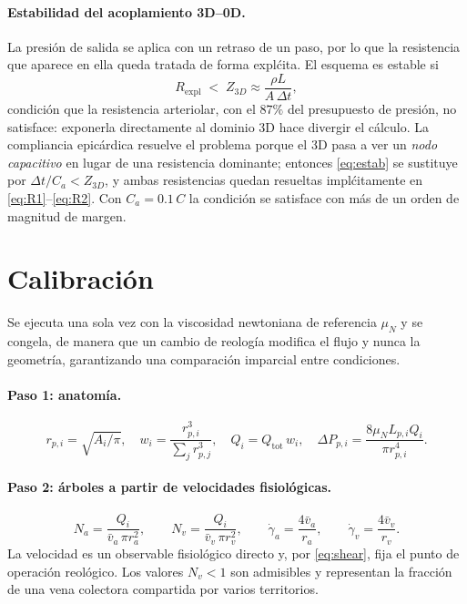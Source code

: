 \documentclass[11pt]{article}
\begin{document}
\paragraph{Estabilidad del acoplamiento 3D--0D.} La presi\'on de salida se
aplica con un retraso de un paso, por lo que la resistencia que aparece en ella
queda tratada de forma expl\'cita. El esquema es estable si
\begin{equation}
  R_{\text{expl}}\;<\;Z_{3D}\approx\frac{\rho L}{A\,\Delta t},
  \label{eq:estab}
\end{equation}
condici\'on que la resistencia arteriolar, con el $87\%$ del presupuesto de
presi\'on, no satisface: exponerla directamente al dominio 3D hace divergir el
c\'alculo. La compliancia epic\'ardica resuelve el problema porque el 3D pasa a
ver un \emph{nodo capacitivo} en lugar de una resistencia dominante; entonces
\eqref{eq:estab} se sustituye por $\Delta t/C_a<Z_{3D}$, y ambas resistencias
quedan resueltas impl\'citamente en \eqref{eq:R1}--\eqref{eq:R2}. Con
$C_a=0.1\,C$ la condici\'on se satisface con m\'as de un orden de magnitud de
margen.

\section{Calibraci\'on}

Se ejecuta una sola vez con la viscosidad newtoniana de referencia $\mu_N$ y se
congela, de manera que un cambio de reolog\'ia modifica el flujo y nunca la
geometr\'ia, garantizando una comparaci\'on imparcial entre condiciones.

\paragraph{Paso 1: anatom\'ia.}
\begin{equation}
  r_{p,i}=\sqrt{A_i/\pi},
  \quad
  w_i=\frac{r_{p,i}^{3}}{\sum_j r_{p,j}^{3}},
  \quad
  Q_i=Q_{\text{tot}}\,w_i,
  \quad
  \Delta P_{p,i}=\frac{8\mu_N L_{p,i}Q_i}{\pi r_{p,i}^{4}} .
  \label{eq:paso1}
\end{equation}

\paragraph{Paso 2: \'arboles a partir de velocidades fisiol\'ogicas.}
\begin{equation}
  N_a=\frac{Q_i}{\bar v_a\,\pi r_a^{2}},
  \qquad
  N_v=\frac{Q_i}{\bar v_v\,\pi r_v^{2}},
  \qquad
  \dot\gamma_a=\frac{4\bar v_a}{r_a},
  \qquad
  \dot\gamma_v=\frac{4\bar v_v}{r_v}.
  \label{eq:paso2}
\end{equation}
La velocidad es un observable fisiol\'ogico directo y, por \eqref{eq:shear},
fija el punto de operaci\'on reol\'ogico. Los valores $N_v<1$ son admisibles y
representan la fracci\'on de una vena colectora compartida por varios
territorios.
\end{document}
